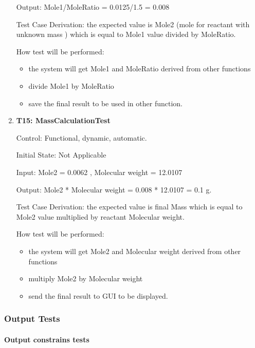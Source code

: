 \documentclass[12pt, titlepage]{article}
\begin{document}
\begin{enumerate}
Output:  Mole1/MoleRatio = 0.0125/1.5 =  0.008

Test Case Derivation: the expected value is Mole2 (mole for reactant with unknown mass ) which is equal to Mole1 value divided by MoleRatio.  				
	
How test will be performed: 
\begin{itemize}
\item the system will get Mole1 and MoleRatio derived from other functions
\item divide Mole1 by MoleRatio  
\item save the final result to be used in other function.
\end{itemize}

\item{\bf T15: MassCalculationTest\\}

Control: Functional, dynamic, automatic.
					
Initial State: Not Applicable
					
Input: Mole2 = 0.0062  , Molecular weight = 12.0107
			
Output:  Mole2 * Molecular weight = 0.008 * 12.0107 = 0.1 g.

Test Case Derivation: the expected value is final Mass which is equal to Mole2 value multiplied by reactant Molecular weight.  				

How test will be performed: 
\begin{itemize}
\item the system will get Mole2 and Molecular weight derived from other functions
\item multiply Mole2 by Molecular weight  
\item send the final result to GUI to be displayed.
\end{itemize}

\end{enumerate}		


\subsubsection{Output Tests}

\paragraph{Output constrains tests}
\end{document}
